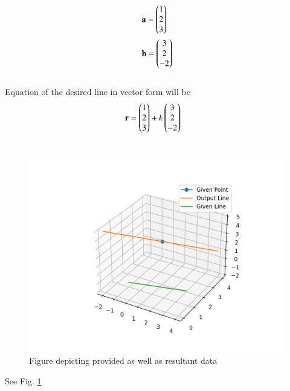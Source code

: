 \begin{align}
&\mathbf{a}=\begin{pmatrix}1\\2\\3\end{pmatrix}\\
&\mathbf{b}=\begin{pmatrix}3\\2\\-2\end{pmatrix}
\end{align}\\
Equation of the desired line in vector form will be
\begin{align}
&\mathbf{r}=\begin{pmatrix}1\\2\\3\end{pmatrix}+k\begin{pmatrix}3\\2\\-2\end{pmatrix}
\end{align}\\
\begin{figure}[h!]
	\centering
	\includegraphics[width=\columnwidth]{./solutions/line_plane/67/Assignment_2_Figure.png}
	\caption{Figure depicting provided as well as resultant data}
	\label{myfig:solutions/line_plane_67/Assignment_2}
\end{figure}
See Fig. 	\ref{myfig:solutions/line_plane_67/Assignment_2}

